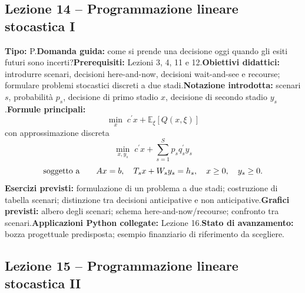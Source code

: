 \documentclass[12pt,a4paper]{article}%
\begin{document}
\subsection{Lezione 14 -- Programmazione lineare stocastica I}

\textbf{Tipo:} P.\newline\textbf{Domanda guida:} come si prende una decisione
oggi quando gli esiti futuri sono incerti?\newline\textbf{Prerequisiti:}
Lezioni 3, 4, 11 e 12.\newline\textbf{Obiettivi didattici:} introdurre
scenari, decisioni here-and-now, decisioni wait-and-see e recourse; formulare
problemi stocastici discreti a due stadi.\newline\textbf{Notazione
introdotta:} scenari $s$, probabilit\`{a} $p_{s}$, decisione di primo stadio
$x$, decisione di secondo stadio $y_{s}$.\newline\textbf{Formule principali:}
\[
\min_{x} \; c^{\prime}x+\mathbb{E}_{\xi}[Q(x,\xi)]
\]
con approssimazione discreta
\[
\min_{x,y_{s}} \; c^{\prime}x+\sum_{s=1}^{S}p_{s} q_{s}^{\prime}y_{s}
\]
\[
\hbox{soggetto a} \qquad Ax=b, \quad T_{s} x+W_{s} y_{s}=h_{s}, \quad x\geq0,
\quad y_{s}\geq0.
\]
\textbf{Esercizi previsti:} formulazione di un problema a due stadi;
costruzione di tabella scenari; distinzione tra decisioni anticipative e non
anticipative.\newline\textbf{Grafici previsti:} albero degli scenari; schema
here-and-now/recourse; confronto tra scenari.\newline\textbf{Applicazioni
Python collegate:} Lezione 16.\newline\textbf{Stato di avanzamento:} bozza
progettuale predisposta; esempio finanziario di riferimento da scegliere.

\subsection{Lezione 15 -- Programmazione lineare stocastica II}
\end{document}
